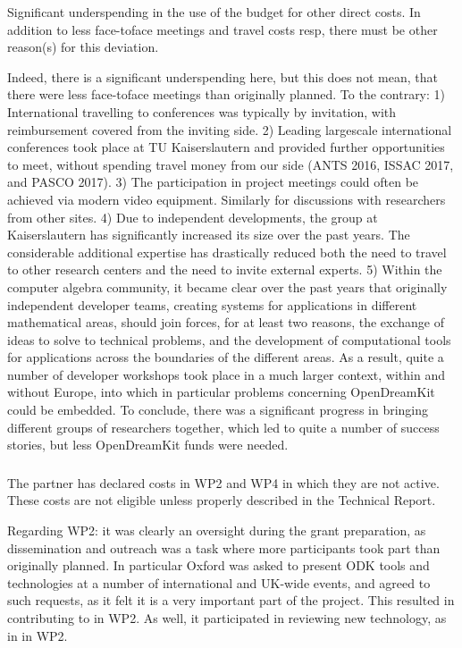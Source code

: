 \begin{EUcomment}
  Significant underspending in the use of the budget for other direct
  costs. In addition to less face-toface meetings and travel costs
  resp, there must be other reason(s) for this deviation.
\end{EUcomment}
Indeed, there is a significant underspending here, but this does not mean, that there were less face-toface
meetings than originally planned. To the contrary: 1) International travelling to conferences was typically 
by invitation, with reimbursement covered from the inviting side. 2) Leading largescale international conferences 
took place at TU Kaiserslautern and provided further opportunities to meet, without spending travel money from our 
side (ANTS 2016, ISSAC 2017, and PASCO 2017). 3) The participation in project meetings could often be achieved 
via modern video equipment. Similarly for discussions with researchers from other sites. 4) Due to independent 
developments, the group at Kaiserslautern has significantly increased its size over the past years. 
The considerable additional expertise has drastically reduced both the need to travel to other research centers 
and the need to invite external experts. 5) Within the computer algebra community, it became clear over the past 
years that originally independent developer teams, creating systems for applications in different mathematical 
areas, should join forces, for at least two reasons, the exchange of ideas to solve to  technical problems, and
the development of computational tools for applications across the boundaries of the different areas. As a result, 
quite a number of developer workshops took place in a much larger context, within and without Europe, into 
which in particular problems concerning OpenDreamKit could be embedded. To conclude, there was a significant 
progress in bringing different groups of researchers together, which led to quite a number of success stories, 
but less OpenDreamKit funds were needed.

\subsubsection{}
\begin{EUcomment}
  The partner has declared costs in WP2 and WP4 in which they are not
  active. These costs are not eligible unless properly described in
  the Technical Report.
\end{EUcomment}
Regarding WP2: it was clearly an oversight during the grant preparation, as dissemination and 
outreach was a task where more participants took part than originally planned. In particular Oxford 
was asked to present ODK tools and technologies at a number of international and UK-wide events,
and agreed to such requests, as it felt it is a very important part of the project. This resulted 
in contributing to  in WP2. As well, it participated in reviewing
new technology, as in  in WP2.

